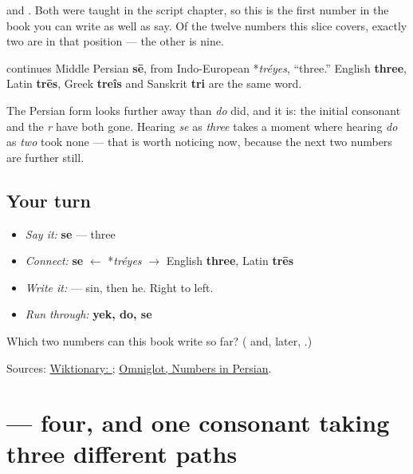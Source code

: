 \textbf{} and \textbf{}. Both were taught in the script chapter, so this is the first number in the book you can write as well as say. Of the twelve numbers this slice covers, exactly two are in that position — the other is nine.

\begin{cousinweb}
\textbf{} continues Middle Persian \textbf{sē}, from Indo-European *\emph{tréyes}, \textquotedblleft{}three.\textquotedblright{} English \textbf{three}, Latin \textbf{trēs}, Greek \textbf{treîs} and Sanskrit \textbf{tri} are the same word.

The Persian form looks further away than \emph{do} did, and it is: the initial consonant and the \emph{r} have both gone. Hearing \emph{se} as \emph{three} takes a moment where hearing \emph{do} as \emph{two} took none — that is worth noticing now, because the next two numbers are further still.
\end{cousinweb}

\subsection*{Your turn}
\begin{itemize}
\raggedright
  \item \emph{Say it:} \textbf{se} — three
  \item \emph{Connect:} \textbf{se} $\leftarrow$ *\emph{tréyes} $\to$ English \textbf{three}, Latin \textbf{trēs}
  \item \emph{Write it:} \textbf{} — sin, then he. Right to left.
  \item \emph{Run through:} \textbf{yek, do, se}
\end{itemize}

\begin{tcolorbox}[breakable,colback=teal!4,colframe=teal!35!black,title={Before you move on}]
Which two numbers can this book write so far? (\textbf{} and, later, \textbf{}.)

Sources: \href{https://en.wiktionary.org/wiki/\%D8\%B3\%D9\%87}{Wiktionary: }; \href{https://www.omniglot.com/language/numbers/persian.htm}{Omniglot, Numbers in Persian}.
\end{tcolorbox}
\section[\texorpdfstring{\fa{چهار} (chahâr)}{چهار (chahâr)}]{ — four, and one consonant taking three different paths}

